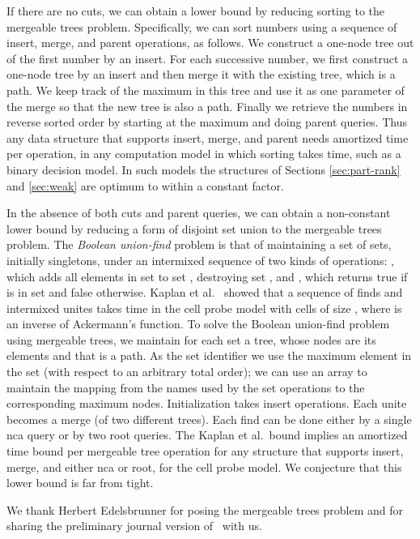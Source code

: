 \documentclass[twoside,leqno,twocolumn]{article}
\begin{document}
If there are no cuts, we can obtain a lower bound by reducing sorting to the mergeable trees problem.  Specifically, we can sort  numbers using a sequence of insert, merge, and parent operations, as follows.  We construct a one-node tree out of the first number by an insert.  For each successive number, we first construct a one-node tree by an insert and then merge it with the existing tree, which is a path.  We keep track of the maximum in this tree and use it as one parameter of the merge so that the new tree is also a path.  Finally we retrieve the numbers in reverse sorted order by starting at the maximum and doing  parent queries.  Thus any data structure that supports insert, merge, and parent needs  amortized time per operation, in any computation model in which sorting takes  time, such as a binary decision model.  In such models the structures of Sections \ref{sec:part-rank} and \ref{sec:weak} are optimum to within a constant factor.

In the absence of both cuts and parent queries, we can obtain a non-constant lower bound by reducing a form of disjoint set union to the mergeable trees problem.  The \emph{Boolean union-find} problem is that of maintaining a set of  sets, initially singletons, under an intermixed sequence of two kinds of operations: , which adds all elements in set  to set , destroying set , and , which returns true if  is in set  and false otherwise.  Kaplan et al.~\cite{KST02} showed that a sequence of  finds and intermixed unites takes  time in the cell probe model with cells of size , where  is an inverse of Ackermann's function.  To solve the Boolean union-find problem using mergeable trees, we maintain for each set a tree, whose nodes are its elements and that is a path.  As the set identifier we use the maximum element in the set (with respect to an arbitrary total order); we can use an array to maintain the mapping from the names used by the set operations to the corresponding maximum nodes.  Initialization takes  insert operations.  Each unite becomes a merge (of two different trees).  Each find can be done either by a single nca query or by two root queries.  The Kaplan et al.\ bound implies an  amortized time bound per mergeable tree operation for any structure that supports insert, merge, and either nca or root, for the cell probe model.  We conjecture that this lower bound is far from tight.


\vspace{.2cm}
 We thank Herbert Edelsbrunner for posing the mergeable trees problem and for sharing the preliminary journal version of~\cite{AEHW04} with us.



\end{document}

